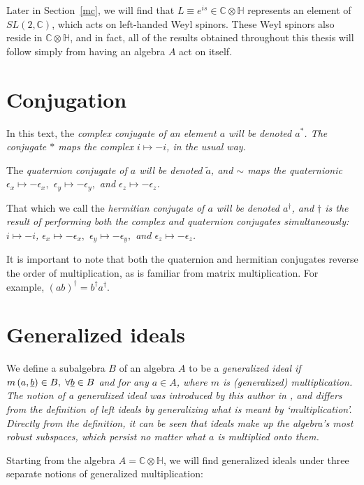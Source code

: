 \documentclass[letterpaper,12pt,titlepage,oneside,final]{book}
\newcommand{\CH}{\mathbb{C}\otimes\mathbb{H}}
\begin{document}
Later in Section~\ref{mc}, we will find that $L\equiv e^{is}\in \CH$ represents an element of $SL(2,\mathbb{C})$, which acts on left-handed Weyl spinors.  These Weyl spinors also reside in $\CH$, and in fact, all of the results obtained throughout this thesis will follow simply from having an algebra $A$ act on itself.

\section{Conjugation  }

In this text, the \it complex conjugate \rm of an element $a$ will be denoted $a^*$.   The conjugate $*$ maps the complex $i\mapsto -i$, in the usual way.  

The \it quaternion conjugate \rm of $a$ will be denoted $\widetilde{a}$, and $\sim$ maps the quaternionic ${\epsilon_x}\mapsto -{\epsilon_x},$ ${\epsilon_y}\mapsto -{\epsilon_y},$ and ${\epsilon_z}\mapsto -{\epsilon_z}$.  

That which we call the \it hermitian conjugate \rm of $a$ will be denoted $a^{\dagger}$, and $\dagger$ is the result of performing both the complex and quaternion conjugates simultaneously:  $i\mapsto -i$, ${\epsilon_x}\mapsto -{\epsilon_x},$ ${\epsilon_y}\mapsto -{\epsilon_y},$ and ${\epsilon_z}\mapsto -{\epsilon_z}$.  

It is important to note that both the quaternion and hermitian conjugates reverse the order of multiplication, as is familiar from matrix multiplication.  For example, $\left(ab\right)^{\dagger} = b^{\dagger}a^{\dagger}$.


\section{Generalized ideals }

We define a subalgebra $B$ of an algebra $A$ to be a \it generalized ideal \rm if $m \left( a, \underline{b} \right) \in B,  \hspace{1mm} \forall \underline{b} \in B$ and for any $a \in A$, where $m$ is (generalized) multiplication.  The notion of a generalized ideal was introduced by this author in \cite{UTI}, and differs from the definition of left ideals by generalizing what is meant by `multiplication'.   Directly from the definition, it can be seen that ideals make up the algebra's most robust subspaces, which persist no matter what $a$ is multiplied onto them. 

Starting from the algebra $A=\mathbb{C}\otimes\mathbb{H}$, we will find generalized ideals under three separate notions of generalized multiplication:  
\end{document}
